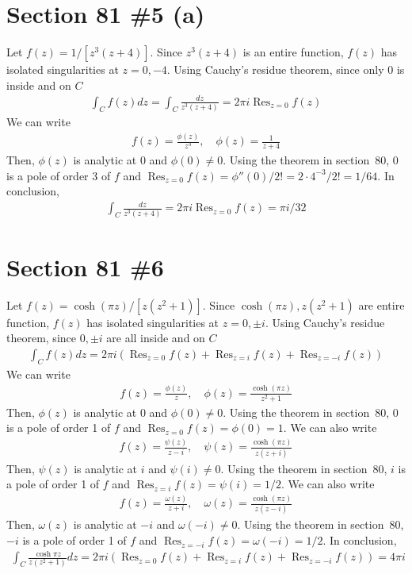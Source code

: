 \documentclass{scrartcl}
\DeclareMathOperator*{\Res}{Res}
\begin{document}
\section{Section 81 \#5 (a)}
Let \(f(z) = 1 / [z^3(z + 4)]\).
Since \(z^3(z + 4)\) is an entire function, \(f(z)\) has isolated singularities at \(z = 0, -4\).
Using Cauchy's residue theorem, since only 0 is inside and on \(C\)
\begin{align*}
  \int_C f(z) dz = \int_C \frac{dz}{z^3(z + 4)} = 2\pi i \Res_{z = 0} f(z)
\end{align*}
We can write
\begin{align*}
  f(z) = \frac{\phi(z)}{z^3}, \quad \phi(z) = \frac{1}{z + 4}
\end{align*}
Then, \(\phi(z)\) is analytic at 0 and \(\phi(0) \not = 0\).
Using the theorem in section~80, 0 is a pole of order 3 of \(f\) and \(\Res_{z = 0} f(z) = \phi''(0) / 2! = 2 \cdot 4^{-3} / 2! = 1 / 64\).
In conclusion,
\begin{align*}
  \int_C \frac{dz}{z^3(z + 4)} = 2\pi i \Res_{z = 0} f(z) = \pi i / 32
\end{align*}

\section{Section 81 \#6}
Let \(f(z) = \cosh (\pi z) / [z(z^2 + 1)]\).
Since \(\cosh (\pi z), z(z^2 + 1)\) are entire function, \(f(z)\) has isolated singularities at \(z = 0, \pm i\).
Using Cauchy's residue theorem, since \(0, \pm i\) are all inside and on \(C\)
\begin{align*}
  \int_C f(z) dz = 2\pi i \left( \Res_{z = 0} f(z) + \Res_{z = i} f(z) + \Res_{z = -i} f(z) \right)
\end{align*}
We can write
\begin{align*}
  f(z) = \frac{\phi(z)}{z}, \quad \phi(z) = \frac{\cosh (\pi z)}{z^2 + 1}
\end{align*}
Then, \(\phi(z)\) is analytic at \(0\) and \(\phi(0) \not = 0\).
Using the theorem in section~80, 0 is a pole of order 1 of \(f\) and \(\Res_{z = 0} f(z) = \phi(0) = 1\).
We can also write
\begin{align*}
  f(z) = \frac{\psi(z)}{z - i}, \quad \psi(z) = \frac{\cosh (\pi z)}{z(z + i)}
\end{align*}
Then, \(\psi(z)\) is analytic at \(i\) and \(\psi(i) \not = 0\).
Using the theorem in section~80, \(i\) is a pole of order 1 of \(f\) and \(\Res_{z = i} f(z) = \psi(i) = 1 / 2\).
We can also write
\begin{align*}
  f(z) = \frac{\omega(z)}{z + i}, \quad \omega(z) = \frac{\cosh (\pi z)}{z(z - i)}
\end{align*}
Then, \(\omega(z)\) is analytic at \(-i\) and \(\omega(-i) \not = 0\).
Using the theorem in section~80, \(-i\) is a pole of order 1 of \(f\) and \(\Res_{z = -i} f(z) = \omega(-i) = 1 / 2\).
In conclusion,
\begin{align*}
  \int_C \frac{\cosh \pi z}{z(z^2 + 1)} dz = 2\pi i \left( \Res_{z = 0} f(z) + \Res_{z = i} f(z) + \Res_{z = -i} f(z) \right) = 4\pi i
\end{align*}
\end{document}
